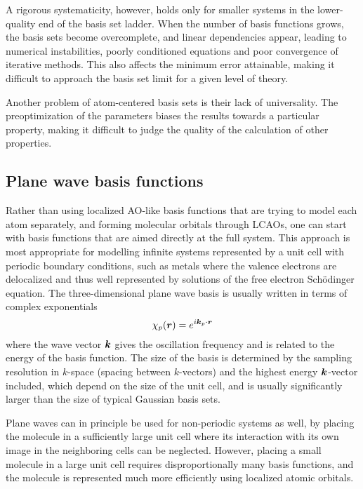 A rigorous systematicity, however, holds only for smaller systems in the lower-quality end of the basis
set ladder. When the number of basis functions grows, the basis sets become overcomplete, and linear
dependencies appear, leading to numerical instabilities, poorly conditioned equations and poor
convergence of iterative methods. This also affects the minimum error attainable, making it difficult 
to approach the basis set limit for a given level of theory.

Another problem of atom-centered basis sets is their lack of universality. The preoptimization of the
parameters biases the results towards a particular property, making it difficult to judge the quality 
of the calculation of other properties.

\subsection{Plane wave basis functions}
Rather than using localized AO-like basis functions that are trying to model each atom separately,
and forming molecular orbitals through LCAOs, one can start with basis functions that are aimed directly
at the full system. This approach is most appropriate for modelling infinite systems represented by
a unit cell with periodic boundary conditions, such as metals where the valence electrons are delocalized
and thus well represented by solutions of the free electron Sch\"{o}dinger equation. The three-dimensional 
plane wave basis is usually written in terms of complex exponentials
\begin{equation}
    \chi_p(\boldsymbol r) = e^{i\boldsymbol k_p\cdot\boldsymbol r}
\end{equation}
where the wave vector $\boldsymbol k$ gives the oscillation frequency and is related to the energy of the basis
function. The size of the basis is determined by the sampling resolution in $k$-space (spacing between 
$k$-vectors) and the highest energy $\boldsymbol k$-vector included, which depend on the size of the unit cell,
and is usually significantly larger than the size of typical Gaussian basis sets. 

Plane waves can in principle be used
for non-periodic systems as well, by placing the molecule in a sufficiently large unit cell where its 
interaction with its own image in the neighboring cells can be neglected. However, placing a small
molecule in a large unit cell requires disproportionally many basis functions, and the molecule is 
represented much more efficiently using localized atomic orbitals.

